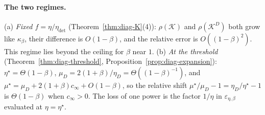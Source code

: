 \documentclass[11pt]{article}
\theoremstyle{remark}
\begin{document}
\paragraph{The two regimes.} (a) \emph{Fixed $f=\eta/\eta_{\mathrm{det}}$} (Theorem~\ref{thm:diag-K}(4)): $\rho(\mathcal K)$ and $\rho(\mathcal K^D)$ both grow like $\kappa_\beta$, their difference is $O(1-\beta)$, and the relative error is $O((1-\beta)^2)$. This regime lies beyond the ceiling for $\beta$ near $1$. (b) \emph{At the threshold} (Theorem~\ref{thm:diag-threshold}, Proposition~\ref{prop:diag-expansion}): $\eta^\star=\Theta(1-\beta)$, $\mu_D=2(1+\beta)/\eta_D=\Theta((1-\beta)^{-1})$, and $\mu^\star=\mu_D+2(1+\beta)c_\infty+O(1-\beta)$, so the relative shift $\mu^\star/\mu_D-1=\eta_D/\eta^\star-1$ is $\Theta(1-\beta)$ when $c_\infty>0$. The loss of one power is the factor $1/\eta$ in $\varepsilon_{\eta,\beta}$ evaluated at $\eta=\eta^\star$.
\end{document}
